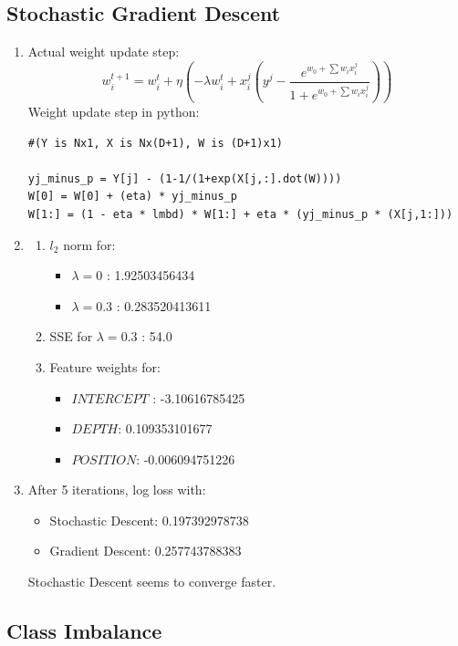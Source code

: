\documentclass[letterpaper]{article}
\begin{document}
\begin{enumerate}
\end{enumerate}


\subsection{Stochastic Gradient Descent}

\begin{enumerate}
\item Actual weight update step: 
\begin{equation}
w^{t+1}_i = w^t_i + \eta(-\lambda w^t_i + x^j_i(y^j - \frac{e^{w_0 + \sum{w_ix^j_i}}}{1 + e^{w_0 + \sum{w_ix^j_i}}}))
\end{equation}
Weight update step in python: 
\begin{verbatim}
#(Y is Nx1, X is Nx(D+1), W is (D+1)x1)

yj_minus_p = Y[j] - (1-1/(1+exp(X[j,:].dot(W))))
W[0] = W[0] + (eta) * yj_minus_p
W[1:] = (1 - eta * lmbd) * W[1:] + eta * (yj_minus_p * (X[j,1:]))
\end{verbatim}
\item 
\begin{enumerate}
\item $l_2$ norm for:
\begin{itemize}
\item $\lambda = 0$ : 1.92503456434
\item $\lambda = 0.3$ : 0.283520413611
\end{itemize} 
\item SSE for $\lambda = 0.3$ : 54.0
\item Feature weights for:
\begin{itemize}
\item $INTERCEPT$ : -3.10616785425 
\item $DEPTH$:  0.109353101677
\item $POSITION$: -0.006094751226
\end{itemize}
\end{enumerate}

\item After 5 iterations, log loss with:
\begin{itemize}
\item Stochastic Descent: 0.197392978738
\item Gradient Descent: 0.257743788383
\end{itemize}
Stochastic Descent seems to converge faster.
\end{enumerate}

\subsection{Class Imbalance}
\end{document}
